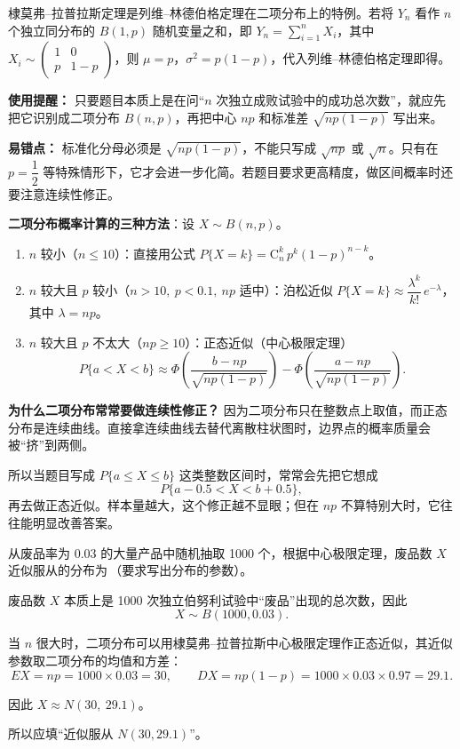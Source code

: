 ﻿\documentclass[lang=cn,11pt]{elegantbook}
\begin{document}
\begin{note}
棣莫弗--拉普拉斯定理是列维--林德伯格定理在二项分布上的特例。若将 \(Y_n\) 看作 \(n\) 个独立同分布的 \(B(1,p)\) 随机变量之和，即 \(Y_n = \sum_{i=1}^{n} X_i\)，其中 \(X_i \sim \begin{pmatrix} 1 & 0 \\ p & 1-p \end{pmatrix}\)，则 \(\mu = p\)，\(\sigma^2 = p(1-p)\)，代入列维--林德伯格定理即得。

\textbf{使用提醒：} 只要题目本质上是在问“\(n\) 次独立成败试验中的成功总次数”，就应先把它识别成二项分布 \(B(n,p)\)，再把中心 \(np\) 和标准差 \(\sqrt{np(1-p)}\) 写出来。

\textbf{易错点：} 标准化分母必须是 \(\sqrt{np(1-p)}\)，不能只写成 \(\sqrt{np}\) 或 \(\sqrt{n}\)。只有在 \(p=\dfrac12\) 等特殊情形下，它才会进一步化简。若题目要求更高精度，做区间概率时还要注意连续性修正。

\textbf{二项分布概率计算的三种方法}：设 \(X \sim B(n, p)\)。
\begin{enumerate}
    \item \(n\) 较小（\(n \leq 10\)）：直接用公式 \(P\{X=k\} = \mathrm{C}_n^k\,p^k(1-p)^{n-k}\)。
    \item \(n\) 较大且 \(p\) 较小（\(n > 10,\ p < 0.1,\ np\) 适中）：泊松近似 \(\displaystyle P\{X=k\} \approx \dfrac{\lambda^k}{k!}\,e^{-\lambda}\)，其中 \(\lambda = np\)。
    \item \(n\) 较大且 \(p\) 不太大（\(np \geq 10\)）：正态近似（中心极限定理）
    \[
    P\{a < X < b\} \approx \Phi\!\left(\frac{b-np}{\sqrt{np(1-p)}}\right) - \Phi\!\left(\frac{a-np}{\sqrt{np(1-p)}}\right).
    \]
\end{enumerate}
\end{note}

\begin{note}
\textbf{为什么二项分布常常要做连续性修正？} 因为二项分布只在整数点上取值，而正态分布是连续曲线。直接拿连续曲线去替代离散柱状图时，边界点的概率质量会被“挤”到两侧。

所以当题目写成 \(P\{a \leq X \leq b\}\) 这类整数区间时，常常会先把它想成
\[
P\{a-0.5 < X < b+0.5\},
\]
再去做正态近似。样本量越大，这个修正越不显眼；但在 \(np\) 不算特别大时，它往往能明显改善答案。
\end{note}

\begin{exercise}\label{exer:5-dml-identify}
从废品率为 0.03 的大量产品中随机抽取 1000 个，根据中心极限定理，废品数 \(X\) 近似服从的分布为\,\underline{\hspace{2cm}}（要求写出分布的参数）。
\end{exercise}
\begin{solution}
废品数 \(X\) 本质上是 1000 次独立伯努利试验中“废品”出现的总次数，因此
\[
X\sim B(1000,0.03).
\]

当 \(n\) 很大时，二项分布可以用棣莫弗--拉普拉斯中心极限定理作正态近似，其近似参数取二项分布的均值和方差：
\[
EX=np=1000\times 0.03=30,\qquad DX=np(1-p)=1000\times 0.03\times 0.97=29.1.
\]

因此 \(X\approx N(30,\ 29.1)\)。

所以应填“近似服从 \(N(30,29.1)\)”。
\end{solution}
\end{document}
